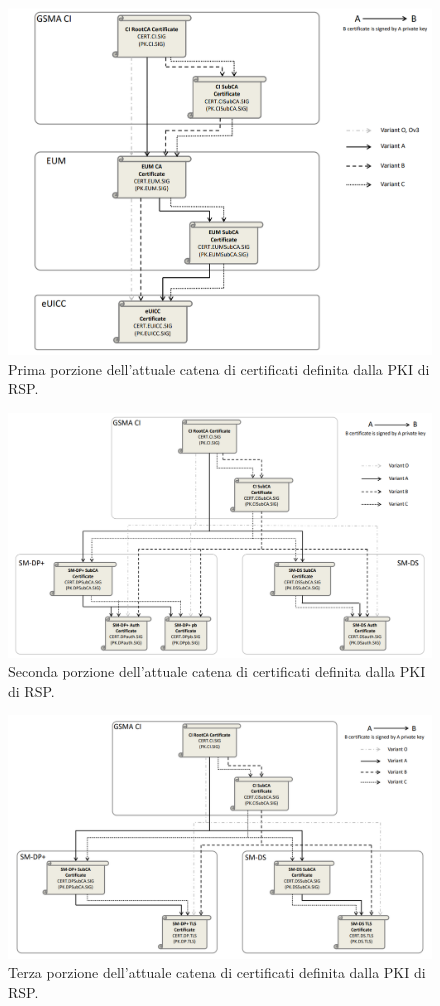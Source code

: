\documentclass[10pt, oneside]{book}
\begin{document}
\begin{figure}
\includegraphics[width=\linewidth]{cert-chain-new1.png}
\caption{Prima porzione dell'attuale catena di certificati definita dalla PKI di RSP.}
\label{fig:cert-chain-new1}
\end{figure}
\begin{figure}
\includegraphics[width=\linewidth]{cert-chain-new2.png}
\caption{Seconda porzione dell'attuale catena di certificati definita dalla PKI di RSP.}
\label{fig:cert-chain-new2}
\end{figure}
\begin{figure}
\includegraphics[width=\linewidth]{cert-chain-new3.png}
\caption{Terza porzione dell'attuale catena di certificati definita dalla PKI di RSP.}
\label{fig:cert-chain-new3}
\end{figure}
\end{document}
